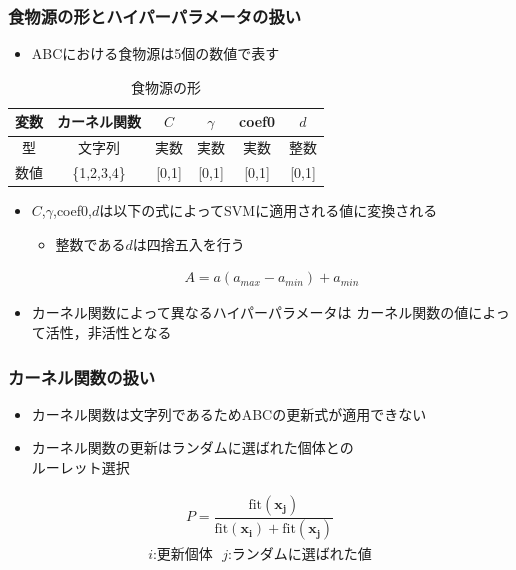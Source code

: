 \documentclass[11pt,dvipdfmx,cjk]{beamer}
\begin{document}
\begin{frame}
  \frametitle{食物源の形とハイパーパラメータの扱い}
  \begin{itemize}
  \item ABCにおける食物源は5個の数値で表す
   \end{itemize}
  \begin{table}[h]
    \centering
    \renewcommand{\arraystretch}{0.9} %
    \caption{食物源の形}
    \begin{tabular}{|c|c|c|c|c|c|}
      \hline
      変数           & カーネル関数 & $C$ &$ \gamma$ & coef0& $d$\\ \hline
      型       & 文字列              & 実数           & 実数                   & 実数           & 整数          \\ \hline
      数値          & \{1,2,3,4\}              & [0,1]           & [0,1]                  & [0,1]           & [0,1]          \\ \hline
      \end{tabular}
    
    \label{tab:variables}
    \end{table}
    \begin{itemize}
  \item $C$,$ \gamma$,coef0,$d$は以下の式によってSVMに適用される値に変換される
  \begin{itemize}
    \item 整数である$d$は四捨五入を行う
  \end{itemize}
  \begin{align*}
    \label{map}
    A =a(a_{max} -a_{min}) + a_{min}
  \end{align*}
  \item カーネル関数によって異なるハイパーパラメータは
  カーネル関数の値によって活性，非活性となる
\end{itemize}
\end{frame}


\begin{frame}
  \frametitle{カーネル関数の扱い}
  \begin{itemize}
  \item カーネル関数は文字列であるためABCの更新式が適用できない
  \item カーネル関数の更新はランダムに選ばれた個体との\\ルーレット選択 
\end{itemize}
\begin{align*}
  P = \dfrac{\mathrm{fit}(\boldsymbol{x_j})}
  {\mathrm{fit}(\boldsymbol{x_i})+\mathrm{fit}(\boldsymbol{x_j})} 
  \end{align*}
  \begin{align*}
  \text{$i$:更新個体~~$j$:ランダムに選ばれた値}
\end{align*} 
\end{frame}
\end{document}
